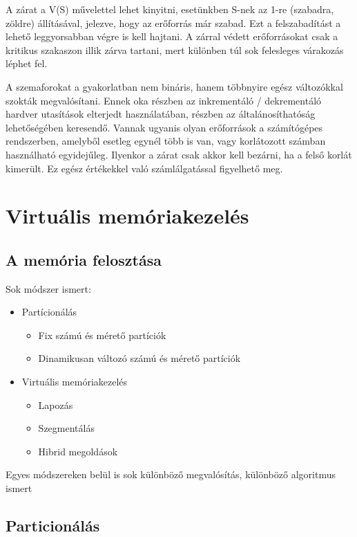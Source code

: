\documentclass[fleqn,10pt,a4paper]{article}
\theoremstyle{magyar}
\begin{document}
  A zárat a V(S) művelettel lehet kinyitni, esetünkben S-nek az 1-re (szabadra, zöldre) állításával, jelezve, hogy az
  erőforrás már szabad. Ezt a felszabadítást a lehető leggyorsabban végre is kell hajtani. A zárral védett erőforrásokat
  csak a kritikus szakaszon illik zárva tartani, mert különben túl sok felesleges várakozás léphet fel. 

  A szemaforokat a gyakorlatban nem bináris, hanem többnyire egész változókkal szokták megvalósítani. Ennek oka részben
  az inkrementáló / dekrementáló hardver utasítások elterjedt használatában, részben az általánosíthatóság lehetőségében
  keresendő. Vannak ugyanis olyan erőforrások a számítógépes rendszerben, amelyből esetleg egynél több is van, vagy
  korlátozott számban használható egyidejűleg. Ilyenkor a zárat csak akkor kell bezárni, ha a felső korlát kimerült. Ez
  egész értékekkel való számlálgatással figyelhető meg. 

  
  \newpage
  \section{Virtuális memóriakezelés}
  \subsection{A memória felosztása}
  
  Sok módszer ismert:
  \begin{itemize}
  \item Partícionálás 
    \begin{itemize}
    \item Fix számú és mérető partíciók 
    \item Dinamikusan változó számú és mérető partíciók 
    \end{itemize}
  \item Virtuális memóriakezelés 
    \begin{itemize}
    \item Lapozás 
    \item Szegmentálás 
    \item Hibrid megoldások 
    \end{itemize}
  \end{itemize}
  Egyes módszereken belül is sok különböző megvalósítás, különböző algoritmus ismert


  \subsection{Particionálás}
\end{document}
